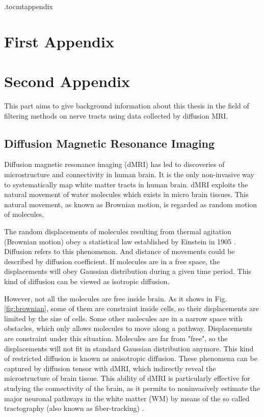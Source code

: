 \newpage
\appendix
\newpage
\etocdepthtag.toc{mtappendix}
\tableofcontents
\newpage


\chapter{First Appendix}


\chapter{Second Appendix}
This part aims to give background information about this thesis in the field of filtering methods on nerve tracts using data collected by diffusion MRI. 


\section{Diffusion Magnetic Resonance Imaging}
\label{sec:dmri}

Diffusion magnetic resonance imaging (dMRI) has led to discoveries of microstructure and connectivity in human brain.
It is the only non-invasive way to 
systematically map white matter tracts in human brain.
dMRI exploits the natural movement of water molecules 
which exists in micro brain tissues. 
This natural movement, as known as Brownian motion, 
is regarded as random motion of molecules. 

The random displacements of molecules 
resulting from thermal agitation (Brownian motion) 
obey a statistical law established by Einstein in 1905 \cite*{lebihanLookingFunctionalArchitecture2003}.
Diffusion refers to this phenomenon.
And distance of movements could be described by diffusion coefficient.
If molecules are in a free space, the displacements will obey Gaussian distribution
during a given time period. This kind of diffusion can be viewed as isotropic diffusion.

However, not all the molecules are free inside brain. As it shows in Fig. \ref{fig:brownian},
some of them are constraint inside cells, so their displacements are limited by the size of cells. 
Some other molecules are in a narrow space with obstacles, which only allows molecules
to move along a pathway. Displacements are constraint under this situation.
Molecules are far from "free", so the displacements will not fit in standard Gaussian distribution anymore.
This kind of restricted diffusion is known as anisotropic diffusion.
These phenomena can be captured by diffusion tensor with dMRI, which indirectly reveal the microstructure of brain tissue.
This ability of dMRI is particularly effective for studying the connectivity of the brain,
as it permits to noninvasively estimate the major neuronal pathways in the white matter (WM) 
by means of the so called tractography (also known as fiber-tracking) \cite*{daducciCOMMITConvexOptimization2015}.

